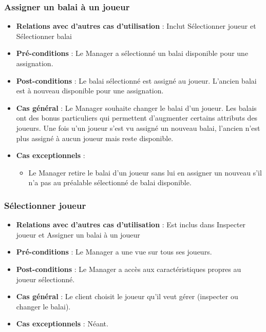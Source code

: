 \documentclass[a4paper,titlepage]{scrreprt}
\begin{document}
    \subsubsection{Assigner un balai à un joueur}
      \begin{itemize}
        \item \textbf{Relations avec d'autres cas d'utilisation}  : Inclut Sélectionner joueur et Sélectionner balai
        \item \textbf{Pré-conditions} : Le Manager a sélectionné un balai disponible pour une assignation.
        \item \textbf{Post-conditions} : Le balai sélectionné est assigné au joueur. L’ancien balai est à nouveau disponible pour une assignation.
        \item \textbf{Cas général} : Le Manager souhaite changer le balai d’un joueur. Les balais ont des bonus particuliers qui permettent d’augmenter certains attributs des joueurs. Une fois u'un joueur s'est vu assigné un nouveau balai, l'ancien n'est plus assigné à aucun joueur mais reste disponible.
        \item \textbf{Cas exceptionnels} :
          \begin{itemize}
            \item Le Manager retire le balai d’un joueur sans lui en assigner un nouveau s’il n'a pas au préalable sélectionné de balai disponible.
          \end{itemize}
      \end{itemize}
    \subsubsection{Sélectionner joueur}
      \begin{itemize}
        \item \textbf{Relations avec d'autres cas d'utilisation}  :  Est inclus dans Inspecter joueur et Assigner un balai à un joueur
        \item \textbf{Pré-conditions} : Le Manager a une vue sur tous ses joueurs.
        \item \textbf{Post-conditions} : Le Manager a accès aux caractéristiques propres au joueur sélectionné.
        \item \textbf{Cas général} : Le client choisit le joueur qu’il veut gérer (inspecter ou changer le balai).
        \item \textbf{Cas exceptionnels} : Néant.
      \end{itemize}
\end{document}
